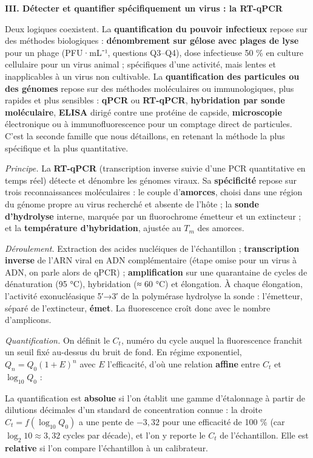 \documentclass[11pt,a4paper]{article}
\newcommand{\equationajustee}[1]{%
  \sbox{\boiteequation}{$\displaystyle #1$}%
  \ifdim\wd\boiteequation>\linewidth
    \[\resizebox{\linewidth}{!}{\usebox{\boiteequation}}\]%
  \else
    \[#1\]%
  \fi}
\begin{document}
\textbf{III. Détecter et quantifier spécifiquement un virus : la RT-qPCR}

Deux logiques coexistent. La \textbf{quantification du pouvoir infectieux} repose sur des méthodes biologiques : \textbf{dénombrement sur gélose avec plages de lyse} pour un phage (PFU·mL⁻¹, questions Q3--Q4), dose infectieuse 50 \% en culture cellulaire pour un virus animal ; spécifiques d'une activité, mais lentes et inapplicables à un virus non cultivable. La \textbf{quantification des particules ou des génomes} repose sur des méthodes moléculaires ou immunologiques, plus rapides et plus sensibles : \textbf{qPCR} ou \textbf{RT-qPCR}, \textbf{hybridation par sonde moléculaire}, \textbf{ELISA} dirigé contre une protéine de capside, \textbf{microscopie} électronique ou à immunofluorescence pour un comptage direct de particules. C'est la seconde famille que nous détaillons, en retenant la méthode la plus spécifique et la plus quantitative.

\emph{Principe.} La \textbf{RT-qPCR} (transcription inverse suivie d'une PCR quantitative en temps réel) détecte et dénombre les génomes viraux. Sa \textbf{spécificité} repose sur trois reconnaissances moléculaires : le couple d'\textbf{amorces}, choisi dans une région du génome propre au virus recherché et absente de l'hôte ; la \textbf{sonde d'hydrolyse} interne, marquée par un fluorochrome émetteur et un extincteur ; et la \textbf{température d'hybridation}, ajustée au \(T_m\) des amorces.

\emph{Déroulement.} Extraction des acides nucléiques de l'échantillon ; \textbf{transcription inverse} de l'ARN viral en ADN complémentaire (étape omise pour un virus à ADN, on parle alors de qPCR) ; \textbf{amplification} sur une quarantaine de cycles de dénaturation (95 °C), hybridation (≈ 60 °C) et élongation. À chaque élongation, l'activité exonucléasique 5′→3′ de la polymérase hydrolyse la sonde : l'émetteur, séparé de l'extincteur, \textbf{émet}. La fluorescence croît donc avec le nombre d'amplicons.

\emph{Quantification.} On définit le \textbf{\(C_t\)}, numéro du cycle auquel la fluorescence franchit un seuil fixé au-dessus du bruit de fond. En régime exponentiel, \(Q_n = Q_0 (1+E)^n\) avec \(E\) l'efficacité, d'où une relation \textbf{affine} entre \(C_t\) et \(\log_{10} Q_0\) :

\equationajustee{C_t = -\frac{1}{\log_{10}(1+E)}\ \log_{10}(Q_0) + \text{constante}.}

La quantification est \textbf{absolue} si l'on établit une gamme d'étalonnage à partir de dilutions décimales d'un standard de concentration connue : la droite \(C_t = f(\log_{10} Q_0)\) a une pente de \(-3{,}32\) pour une efficacité de 100 \% (car \(\log_2 10 \approx 3{,}32\) cycles par décade), et l'on y reporte le \(C_t\) de l'échantillon. Elle est \textbf{relative} si l'on compare l'échantillon à un calibrateur.
\end{document}
